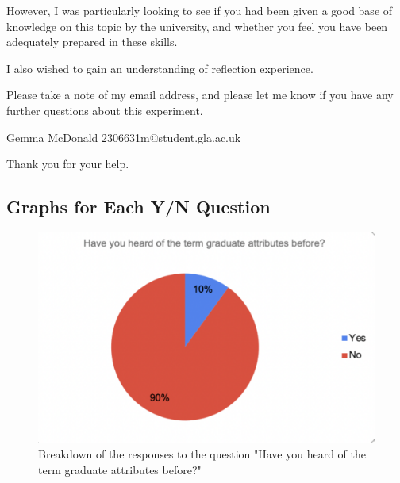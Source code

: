 \documentclass{l4proj}
\begin{document}
\begin{appendices}
However, I was particularly looking to see if you had been given a good base of knowledge on this topic by the university, and whether you feel you have been adequately prepared in these skills. 

I also wished to gain an understanding of reflection experience. 

Please take a note of my email address, and please let me know if you have any further questions about this experiment.

Gemma McDonald
2306631m@student.gla.ac.uk

Thank you for your help.


\subsection{Graphs for Each Y/N Question}

\begin{figure}[H]
    \begin{centering}
    \includegraphics[scale=0.5]{images/GradAttr-1.pdf}
    \caption{Breakdown of the responses to the question "Have you heard of the term graduate attributes before?"}
    \label{fig: GradAttr-1}
    \end{centering}
\end{figure}


\end{appendices}
\end{document}

